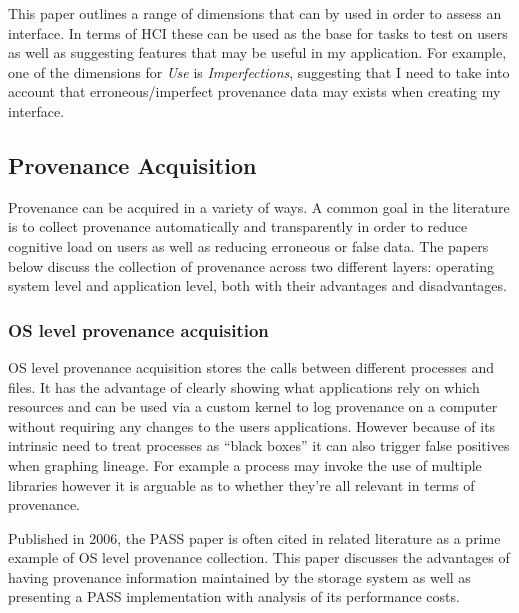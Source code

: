 This paper outlines a range of dimensions that can by used in order to assess an interface. In terms of HCI these can be used as the base for tasks to test on users as well as suggesting features that may be useful in my application. For example, one of the dimensions for \textit{Use} is \textit{Imperfections}, suggesting that I need to take into account that erroneous/imperfect provenance data may exists when creating my interface.

\subsection{Provenance Acquisition}
\label{sec:provenance_acquisition}

Provenance can be acquired in a variety of ways. A common goal in the literature is to collect provenance automatically and transparently in order to reduce cognitive load on users as well as reducing erroneous or false data. The papers below discuss the collection of provenance across two different layers: operating system level and application level, both with their advantages and disadvantages.

\subsubsection{OS level provenance acquisition}
\label{sub:os_level_provenance_acquisition}

OS level provenance acquisition stores the calls between different processes and files. It has the advantage of clearly showing what applications rely on which resources and can be used via a custom kernel to log provenance on a computer without requiring any changes to the users applications.
However because of its intrinsic need to treat processes as ``black boxes'' it can also trigger false positives when graphing lineage. For example a process may invoke the use of multiple libraries however it is arguable as to whether they're all relevant in terms of provenance.

Published in 2006, the PASS paper is often cited in related literature as a prime example of OS level provenance collection. This paper discusses the advantages of having provenance information maintained by the storage system as well as presenting a PASS implementation with analysis of its performance costs.

